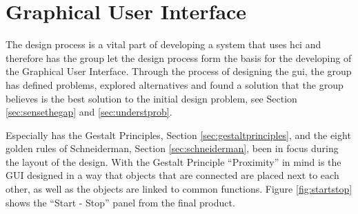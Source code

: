 



\section{Graphical User Interface}
The design process is a vital part of developing a system that uses \acrfull{hci} and therefore has the group let the design process form the basis for the developing of the \acrlong{Graphical User Interface}. Through the process of designing the \acrshort{gui}, the group has defined problems, explored alternatives and found a solution that the group believes is the best solution to the initial design problem, see Section \ref{sec:sensethegap} and \ref{sec:understprob}.

Especially has the Gestalt Principles, Section \ref{sec:gestaltprinciples}, and the eight golden rules of Schneiderman, Section \ref{sec:schneiderman}, been in focus during the layout of the design. With the Gestalt Principle ``Proximity'' in mind is the GUI designed in a way that objects that are connected are placed next to each other, as well as the objects are linked to common functions. Figure \ref{fig:startstop} shows the ``Start - Stop'' panel from the final product. 


